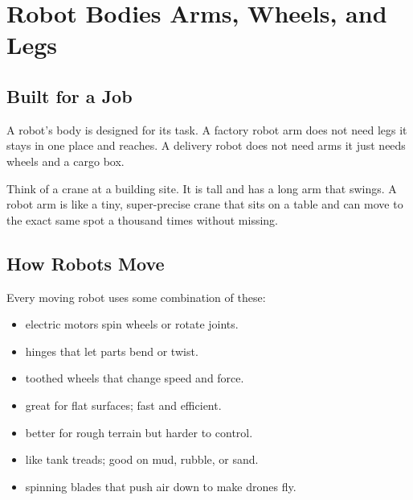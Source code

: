 
\chapter{Robot Bodies \textemdash{} Arms, Wheels, and Legs}


\section*{Built for a Job}

A robot's body is designed for its task. A factory robot arm does not need
legs \textemdash{} it stays in one place and reaches. A delivery robot does not
need arms \textemdash{} it just needs wheels and a cargo box.


\begin{picturethis}
  Think of a crane at a building site. It is tall and has a long arm that
  swings. A robot arm is like a tiny, super-precise crane that sits on a
  table and can move to the exact same spot a thousand times without missing.
\end{picturethis}

\sectionrule

\section*{How Robots Move}

Every moving robot uses some combination of these:

\begin{itemize}
  \item {} \textemdash{} electric motors spin wheels or rotate joints.
  \item {} \textemdash{} hinges that let parts bend or twist.
  \item {} \textemdash{} toothed wheels that change speed and force.
  \item {} \textemdash{} great for flat surfaces; fast and efficient.
  \item {} \textemdash{} better for rough terrain but harder to control.
  \item {} \textemdash{} like tank treads; good on mud, rubble, or sand.
  \item {} \textemdash{} spinning blades that push air down to make drones fly.
\end{itemize}

